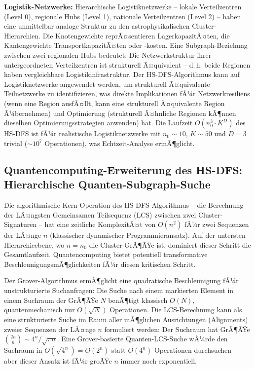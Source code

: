 ﻿\documentclass[a4paper,12pt]{report}
\theoremstyle{definition}
\begin{document}
\textbf{Logistik-Netzwerke:} Hierarchische Logistiknetzwerke -- lokale Verteilzentren (Level 0), regionale Hubs (Level 1), nationale Verteilzentren (Level 2) -- haben eine unmittelbar analoge Struktur zu den astrophysikalischen Cluster-Hierarchien. Die Knotengewichte reprÃ¤sentieren LagerkapazitÃ¤ten, die Kantengewichte TransportkapazitÃ¤ten oder -kosten. Eine Subgraph-Beziehung zwischen zwei regionalen Hubs bedeutet: Die Netzwerkstruktur ihrer untergeordneten Verteilzentren ist strukturell Ã¤quivalent -- d.\,h. beide Regionen haben vergleichbare Logistikinfrastruktur. Der HS-DFS-Algorithmus kann auf Logistiknetzwerke angewendet werden, um strukturell Ã¤quivalente Teilnetzwerke zu identifizieren, was direkte Implikationen fÃ¼r Netzwerkresiliens (wenn eine Region ausfÃ¤llt, kann eine strukturell Ã¤quivalente Region Ã¼bernehmen) und Optimierung (strukturell Ã¤hnliche Regionen kÃ¶nnen dieselben Optimierungsstrategien anwenden) hat. Die Laufzeit $O(n_0^3 \cdot K^D)$ des HS-DFS ist fÃ¼r realistische Logistiknetzwerke mit $n_0 \sim 10$, $K \sim 50$ und $D = 3$ trivial ($\sim 10^7$ Operationen), was Echtzeit-Analyse ermÃ¶glicht.

\subsection{Quantencomputing-Erweiterung des HS-DFS: Hierarchische Quanten-Subgraph-Suche}

Die algorithmische Kern-Operation des HS-DFS-Algorithmus -- die Berechnung der LÃ¤ngsten Gemeinsamen Teilsequenz (LCS) zwischen zwei Cluster-Signaturen -- hat eine zeitliche KomplexitÃ¤t von $O(n^2)$ fÃ¼r zwei Sequenzen der LÃ¤nge $n$ (klassischer dynamischer Programmieransatz). Auf der untersten Hierarchieebene, wo $n = n_0$ die Cluster-GrÃ¶ÃŸe ist, dominiert dieser Schritt die Gesamtlaufzeit. Quantencomputing bietet potentiell transformative BeschleunigungsmÃ¶glichkeiten fÃ¼r diesen kritischen Schritt.

Der Grover-Algorithmus \cite{grover1996} ermÃ¶glicht eine quadratische Beschleunigung fÃ¼r unstrukturierte Suchanfragen: Die Suche nach einem markierten Element in einem Suchraum der GrÃ¶ÃŸe $N$ benÃ¶tigt klassisch $O(N)$, quantenmechanisch nur $O(\sqrt{N})$ Operationen. Die LCS-Berechnung kann als eine strukturierte Suche im Raum aller mÃ¶glichen Ausrichtungen (Alignments) zweier Sequenzen der LÃ¤nge $n$ formuliert werden: Der Suchraum hat GrÃ¶ÃŸe $\binom{2n}{n} \sim 4^n / \sqrt{\pi n}$. Eine Grover-basierte Quanten-LCS-Suche wÃ¼rde den Suchraum in $O(\sqrt{4^n}) = O(2^n)$ statt $O(4^n)$ Operationen durchsuchen -- aber dieser Ansatz ist fÃ¼r groÃŸe $n$ immer noch exponentiell.
\end{document}
